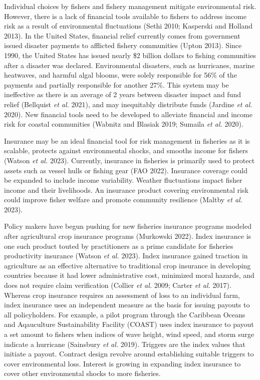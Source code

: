 \documentclass[
  letterpaper,
  DIV=11,
  numbers=noendperiod]{scrartcl}
\theoremstyle{plain}
\theoremstyle{plain}
\theoremstyle{remark}
\begin{document}
Individual choices by fishers and fishery management mitigate
environmental risk. However, there is a lack of financial tools
available to fishers to address income risk as a result of environmental
fluctuations (Sethi 2010; Kasperski and Holland 2013). In the United
States, financial relief currently comes from government issued disaster
payments to afflicted fishery communities (Upton 2013). Since 1990, the
United States has issued nearly \$2 billion dollars to fishing
communities after a disaster was declared. Environmental disasters, such
as hurricanes, marine heatwaves, and harmful algal blooms, were solely
responsible for 56\% of the payments and partially responsible for
another 27\%. This system may be ineffective as there is an average of 2
years between disaster impact and fund relief (Bellquist \emph{et al.}
2021), and may inequitably distribute funds (Jardine \emph{et al.}
2020). New financial tools need to be developed to alleviate financial
and income risk for coastal communities (Wabnitz and Blasiak 2019;
Sumaila \emph{et al.} 2020).

Insurance may be an ideal financial tool for risk management in
fisheries as it is scalable, protects against environmental shocks, and
smooths income for fishers (Watson \emph{et al.} 2023). Currently,
insurance in fisheries is primarily used to protect assets such as
vessel hulls or fishing gear (FAO 2022). Insurance coverage could be
expanded to include income variability. Weather fluctuations impact
fisher income and their livelihoods. An insurance product covering
environmental risk could improve fisher welfare and promote community
resilience (Maltby \emph{et al.} 2023).

Policy makers have begun pushing for new fisheries insurance programs
modeled after agricultural crop insurance programs (Murkowski 2022).
Index insurance is one such product touted by practitioners as a prime
candidate for fisheries productivity insurance (Watson \emph{et al.}
2023). Index insurance gained traction in agriculture as an effective
alternative to traditional crop insurance in developing countries
because it had lower administrative cost, minimized moral hazards, and
does not require claim verification (Collier \emph{et al.} 2009; Carter
\emph{et al.} 2017). Whereas crop insurance requires an assessment of
loss to an individual farm, index insurance uses an independent measure
as the basis for issuing payouts to all policyholders. For example, a
pilot program through the Caribbean Oceans and Aqauculture
Sustainability Facility (COAST) uses index insurance to payout a set
amount to fishers when indices of wave height, wind speed, and storm
surge indicate a hurricane (Sainsbury \emph{et al.} 2019). Triggers are
the index values that initiate a payout. Contract design revolve around
establishing suitable triggers to cover environmental loss. Interest is
growing in expanding index insurance to cover other environmental shocks
to more fisheries.
\end{document}
